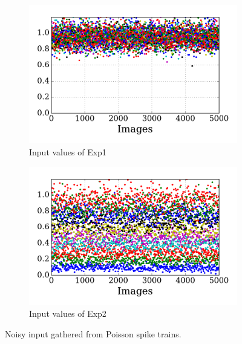 \begin{figure}
	\centering
	\DIFdelbeginFL %
\DIFdelendFL \DIFaddbeginFL \begin{subfigure}[t]{0.48\textwidth}
		\DIFaddendFL \includegraphics[width=\textwidth]{pics_sdlm/21_exp_AE_noise/exp1.pdf}
		\caption{Input values of Exp1}
	\end{subfigure}
	\DIFdelbeginFL %
\DIFdelendFL \DIFaddbeginFL \begin{subfigure}[t]{0.48\textwidth}
		\DIFaddendFL \includegraphics[width=\textwidth]{pics_sdlm/21_exp_AE_noise/exp2.pdf}
		\caption{Input values of Exp2}
	\end{subfigure}
	\caption{Noisy input gathered from Poisson spike trains.}
	\label{fig:noise_input}
\end{figure}


